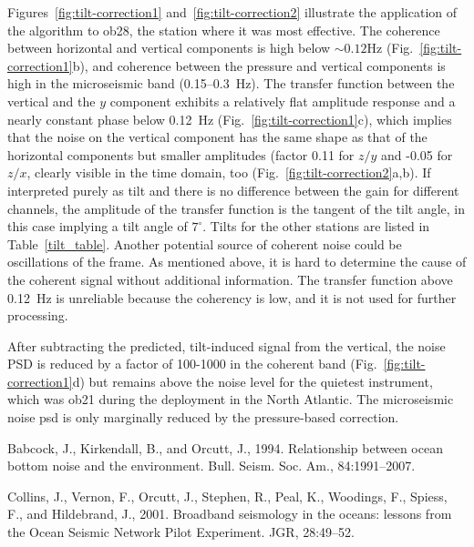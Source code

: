 \documentclass{article}
\begin{document}
{Figures~\ref{fig:tilt-correction1}
and~\ref{fig:tilt-correction2} illustrate the application of the
algorithm to ob28, the station where it was most effective. The
coherence between horizontal  and vertical components is high
below $\sim 0.12$Hz (Fig.~\ref{fig:tilt-correction1}b), and coherence
between the pressure and vertical components is high in the
microseismic band (0.15--0.3~Hz). The transfer function between the
vertical and the $y$ component exhibits a relatively flat amplitude
response and a nearly constant phase below 0.12~Hz (Fig.~\ref{fig:tilt-correction1}c), which implies that
the noise on the vertical component has the same shape as that of the
horizontal  components but smaller amplitudes (factor 0.11 for $z/y$
and -0.05 for $z/x$, clearly visible in
the time domain, too (Fig.~\ref{fig:tilt-correction2}a,b).
If interpreted purely as tilt and there is no
difference between the gain for different channels, the amplitude of
the transfer function is the tangent of the tilt angle, in this case
implying a tilt angle of $7^{\circ}$. Tilts for the other stations are
listed in Table~\ref{tilt_table}.
Another potential source of coherent noise
could be oscillations of the frame.  As mentioned above, it is hard to
determine the cause of the coherent signal without additional
information.  The transfer function above
0.12~Hz is unreliable because the coherency is low, and it is not used
for further processing.

After subtracting the predicted, tilt-induced signal from 
the vertical, 
the noise PSD is reduced by a factor of 100-1000
in the coherent band 
(Fig.~\ref{fig:tilt-correction1}d) 
but remains above the noise level for the
quietest instrument, 
 which was ob21 during the deployment in the 
North Atlantic.  
The microseismic noise psd is only
marginally reduced by the pressure-based correction.

 
%
%
\begin{thebibliography}{}

Babcock, J., Kirkendall, B., and Orcutt, J., 1994.
\newblock Relationship between ocean bottom noise and the environment.
\newblock Bull. Seism. Soc. Am., 84:1991--2007.

Collins, J., Vernon, F., Orcutt, J., Stephen, R., Peal, K., Woodings, F.,
  Spiess, F., and Hildebrand, J., 2001.
\newblock Broadband seismology in the oceans: lessons from the {Ocean Seismic
  Network Pilot Experiment}.
\newblock JGR, 28:49--52.


\end{thebibliography}}
\end{document}

